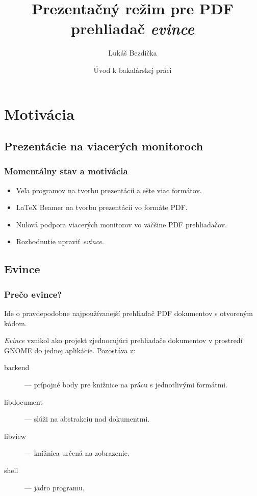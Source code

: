 \documentclass{beamer}
\title[Prezentačný mód evince]
{Prezentačný režim pre PDF prehliadač \emph{evince}}
\author[Bezdička L.]
{Lukáš Bezdička}
\institute[FI MUNI]
{
  Fakulta informatiky\\
  Masarykova univerzita
}
\date[Jar 2011]
{Úvod k bakalárskej práci}
\begin{document}
\begin{frame}
  \titlepage
\end{frame}

\section{Motivácia}

\subsection{Prezentácie na viacerých monitoroch}

\begin{frame}
  \frametitle{Momentálny stav a motivácia}

  \begin{itemize}
  \item
    Veľa programov na tvorbu prezentácií a ešte viac formátov. 
    \pause
  \item
    LaTeX Beamer na tvorbu prezentácií vo formáte PDF. 
    \pause
  \item
    Nulová podpora viacerých monitorov vo väčšine PDF prehliadačov. 
    \pause
  \item
    Rozhodnutie upraviť \emph{evince}.
  \end{itemize}
\end{frame}

\subsection{Evince}
\begin{frame}
\frametitle{Prečo evince?}
Ide o pravdepodobne najpoužívanejší prehliadač PDF dokumentov s otvoreným kódom.
\end{frame}
\begin{frame}
\emph{Evince} vznikol ako projekt zjednocujúci prehliadače dokumentov v prostredí GNOME do jednej aplikácie.
Pozostáva z:

\begin{description}
\item [backend] --- prípojné body pre knižnice na prácu s jednotlivými formátmi.
\item [libdocument] --- slúži na abstrakciu nad dokumentmi.
\item [libview] --- knižnica určená na zobrazenie.
\item [shell] --- jadro programu.
\end{description}

\end{frame}
\end{document}
